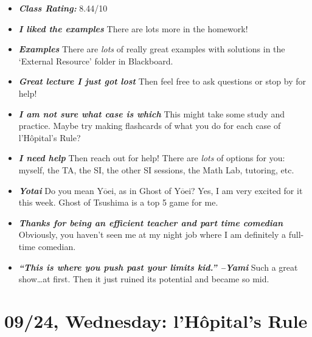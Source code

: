 \documentclass[11pt,letterpaper]{article}
\begin{document}
\begin{itemize}
\item {\bfseries\itshape Class Rating:} 8.44/10 

\item {\bfseries\itshape I liked the examples} There are lots more in the homework!

\item {\bfseries\itshape Examples} There are \textit{lots} of really great examples with solutions in the `External Resource' folder in Blackboard. 

\item {\bfseries\itshape Great lecture I just got lost} Then feel free to ask questions or stop by for help!

\item {\bfseries\itshape I am not sure what case is which} This might take some study and practice. Maybe try making flashcards of what you do for each case of l'H\^{o}pital's Rule?

\item {\bfseries\itshape I need help} Then reach out for help! There are \textit{lots} of options for you: myself, the TA, the SI, the other SI sessions, the Math Lab, tutoring, etc.

\item {\bfseries\itshape Yotai} Do you mean Y$\overline{\text{o}}$ei, as in Ghost of Y$\overline{\text{o}}$ei? Yes, I am very excited for it this week. Ghost of Tsushima is a top 5 game for me. 

\item {\bfseries\itshape Thanks for being an efficient teacher and part time comedian} Obviously, you haven't seen me at my night job where I am definitely a full-time comedian. 

\item {\bfseries\itshape ``This is where you push past your limits kid.'' --Yami} Such a great show\dots at first. Then it just ruined its potential and became so mid.  
\end{itemize}

\newpage
\section*{09/24, Wednesday: l'H\^{o}pital's Rule\label{09-24}}
\end{document}
